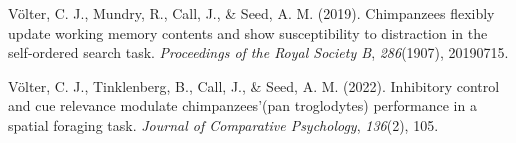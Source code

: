 \documentclass[
  man,floatsintext]{apa6}
\newlength{\cslhangindent}
\newlength{\cslentryspacingunit} %
\newenvironment{CSLReferences}[2] %
 {%
  \setlength{\parindent}{0pt}
  \ifodd #1
  \let\oldpar\par
  \def\par{\hangindent=\cslhangindent\oldpar}
  \fi
  \setlength{\parskip}{#2\cslentryspacingunit}
 }%
 {}
\begin{document}
\begin{CSLReferences}{1}{0}
\leavevmode{}%
Völter, C. J., Mundry, R., Call, J., \& Seed, A. M. (2019). Chimpanzees flexibly update working memory contents and show susceptibility to distraction in the self-ordered search task. \emph{Proceedings of the Royal Society B}, \emph{286}(1907), 20190715.

\leavevmode{}%
Völter, C. J., Tinklenberg, B., Call, J., \& Seed, A. M. (2022). Inhibitory control and cue relevance modulate chimpanzees'(pan troglodytes) performance in a spatial foraging task. \emph{Journal of Comparative Psychology}, \emph{136}(2), 105.

\end{CSLReferences}
\end{document}
